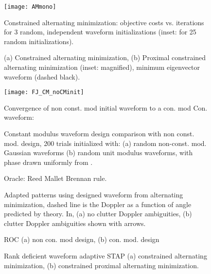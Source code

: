 \documentclass[11pt,draftclsnofoot,onecolumn]{IEEEtran}
\theoremstyle{definition}
\theoremstyle{remark}
\begin{document}
\begin{figure}[htbp!]
\centering
\texttt{[image: AMmono]}
\caption{Constrained alternating minimization: objective costs vs. iterations for 3 random, independent waveform initializations (inset: for 25 random initializations).}
\label{fig4}
\end{figure}
\begin{figure*}[htbp!]
\centering
\caption{(a) Constrained alternating minimization, (b) Proximal constrained alternating minimization (inset: magnified), minimum eigenvector waveform (dashed black).}
\label{fig5}
\end{figure*}
\begin{figure}[htbp!]
\centering
  \texttt{[image: FJ\_CM\_noCMinit]} 
\caption{Convergence of non const. mod initial waveform to  a con. mod Con.  waveform:}
\label{fig6}
\end{figure}
\begin{figure*}[htbp!]
\centering
\caption{Constant modulus waveform design comparison with non const. mod. design, 200 trials initialized with: (a) random non-const. mod. Gaussian waveforms (b) random unit modulus waveforms, with phase drawn uniformly from .  }
\label{fig7}
\end{figure*}
\begin{figure}[htbp!]
\centering
\caption{Oracle: Reed Mallet Brennan rule.}
\label{fig8}
\end{figure}
\begin{figure}[htbp!]
\centering
\caption{Adapted patterns using designed waveform from alternating minimization, dashed line is the Doppler as a function of angle predicted by theory. In, (a) no clutter Doppler ambiguities, (b) clutter Doppler ambiguities shown with arrows.}
\label{fig9}
\end{figure}
\begin{figure*}[htbp!]
\centering
\caption{ROC (a) non con. mod design, (b) con. mod. design }
\label{fig10}
\end{figure*}
\begin{figure*}[htbp!]
\centering
\caption{Rank deficient waveform adaptive STAP (a) constrained alternating minimization, (b) constrained proximal alternating minimization.}
\label{fig11}
\end{figure*}
\end{document}
